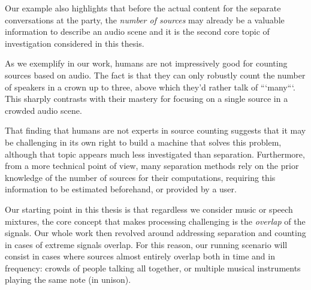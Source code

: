 Our example also highlights that before the actual content for the separate conversations at the party, the \emph{number of sources} may already be a valuable information to describe an audio scene and it is the second core topic of investigation considered in this thesis.

As we exemplify in our work, humans are not impressively good for counting sources based on audio. The fact is that they can only robustly count the number of speakers in a crown up to three, above which they'd rather talk of ```many```.
This sharply contrasts with their mastery for focusing on a single source in a crowded audio scene.
\par
That finding that humans are not experts in source counting suggests that it may be challenging in its own right to build a machine that solves this problem, although that topic appears much less investigated than separation. %
Furthermore, from a more technical point of view, many separation methods rely on the prior knowledge of the number of sources for their computations, requiring this information to be estimated beforehand, or provided by a user.


\par
Our starting point in this thesis is that regardless we consider music or speech mixtures, the core concept that makes processing challenging is the \emph{overlap} of the signals. Our whole work then revolved around addressing separation and counting in cases of extreme signals overlap.
For this reason, our running scenario will consist in cases where sources almost entirely overlap both in time and in frequency: crowds of people talking all together, or multiple musical instruments playing the same note (in unison).

